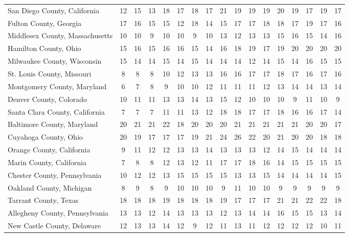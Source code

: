 \begin{landscape}
\begin{longtable}{lcccccccccccccccc}
	San Diego County, California & 12 & 15 & 13 & 18 & 17 & 18 & 17 & 21 & 19 & 19 & 19 & 20 & 19 & 17 & 19 & 17 \\
	Fulton County, Georgia & 17 & 16 & 15 & 15 & 12 & 18 & 14 & 15 & 17 & 17 & 18 & 18 & 17 & 19 & 17 & 16 \\
	Middlesex County, Massachusetts & 10 & 10 & 9 & 10 & 10 & 9 & 10 & 13 & 12 & 13 & 13 & 15 & 16 & 15 & 14 & 16 \\
	Hamilton County, Ohio & 15 & 16 & 15 & 16 & 16 & 15 & 14 & 16 & 18 & 19 & 17 & 19 & 20 & 20 & 20 & 20 \\
	Milwaukee County, Wisconsin & 15 & 14 & 14 & 15 & 14 & 15 & 14 & 14 & 14 & 12 & 14 & 15 & 14 & 16 & 15 & 15 \\
	St. Louis County, Missouri & 8 & 8 & 8 & 10 & 12 & 13 & 13 & 16 & 16 & 17 & 17 & 18 & 17 & 16 & 17 & 16 \\
	Montgomery County, Maryland & 6 & 7 & 8 & 9 & 10 & 10 & 12 & 11 & 11 & 11 & 12 & 13 & 14 & 14 & 13 & 14 \\
	Denver County, Colorado & 10 & 11 & 11 & 13 & 13 & 14 & 13 & 15 & 12 & 10 & 10 & 10 & 9 & 11 & 10 & 9 \\
	Santa Clara County, California & 7 & 7 & 7 & 11 & 11 & 13 & 12 & 18 & 18 & 17 & 17 & 18 & 16 & 16 & 17 & 14 \\
	Baltimore County, Maryland & 20 & 21 & 21 & 22 & 18 & 20 & 20 & 20 & 21 & 21 & 21 & 21 & 21 & 20 & 20 & 17 \\
	Cuyahoga County, Ohio & 20 & 19 & 17 & 17 & 17 & 19 & 21 & 24 & 26 & 22 & 20 & 21 & 20 & 20 & 18 & 18 \\
	Orange County, California & 9 & 11 & 12 & 12 & 13 & 13 & 14 & 13 & 13 & 13 & 12 & 14 & 15 & 14 & 14 & 14 \\
	Marin County, California & 7 & 8 & 8 & 12 & 13 & 12 & 11 & 17 & 17 & 18 & 16 & 14 & 15 & 15 & 15 & 15 \\
	Chester County, Pennsylvania & 10 & 12 & 12 & 13 & 15 & 15 & 15 & 15 & 13 & 13 & 15 & 14 & 14 & 14 & 14 & 15 \\
	Oakland County, Michigan & 8 & 9 & 8 & 9 & 10 & 10 & 10 & 9 & 11 & 10 & 10 & 9 & 9 & 9 & 9 & 9 \\
	Tarrant County, Texas & 18 & 18 & 18 & 19 & 18 & 18 & 18 & 19 & 17 & 17 & 17 & 21 & 21 & 22 & 22 & 18 \\
	Allegheny County, Pennsylvania & 13 & 13 & 12 & 14 & 13 & 13 & 13 & 12 & 13 & 14 & 14 & 16 & 15 & 15 & 13 & 14 \\
	New Castle County, Delaware & 12 & 13 & 13 & 14 & 12 & 9 & 12 & 11 & 13 & 11 & 12 & 12 & 12 & 12 & 10 & 11 \\

\end{longtable}
\end{landscape}
